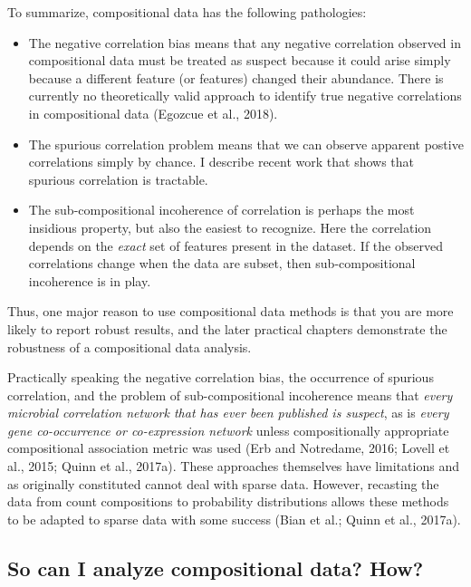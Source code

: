 \documentclass[twocolumn]{article}
\begin{document}
To summarize, compositional data has the following pathologies:

\begin{itemize}
\item
  The negative correlation bias means that any negative correlation
  observed in compositional data must be treated as suspect because it
  could arise simply because a different feature (or features) changed
  their abundance. There is currently no theoretically valid approach to
  identify true negative correlations in compositional data (Egozcue et
  al., 2018).
\item
  The spurious correlation problem means that we can observe apparent
  postive correlations simply by chance. I describe recent work that
  shows that spurious correlation is tractable.
\item
  The sub-compositional incoherence of correlation is perhaps the most
  insidious property, but also the easiest to recognize. Here the
  correlation depends on the \emph{exact} set of features present in the
  dataset. If the observed correlations change when the data are subset,
  then sub-compositional incoherence is in play.
\end{itemize}

Thus, one major reason to use compositional data methods is that you are
more likely to report robust results, and the later practical chapters
demonstrate the robustness of a compositional data analysis.

Practically speaking the negative correlation bias, the occurrence of
spurious correlation, and the problem of sub-compositional incoherence
means that
\emph{every microbial correlation network that has ever been published is suspect},
as is \emph{every gene co-occurrence or co-expression network} unless
compositionally appropriate compositional association metric was used
(Erb and Notredame, 2016; Lovell et al., 2015; Quinn et al., 2017a).
These approaches themselves have limitations and as originally
constituted cannot deal with sparse data. However, recasting the data
from count compositions to probability distributions allows these
methods to be adapted to sparse data with some success (Bian et al.;
Quinn et al., 2017a).

\subsection{So can I analyze compositional data?
How?}\label{so-can-i-analyze-compositional-data-how}
\end{document}
